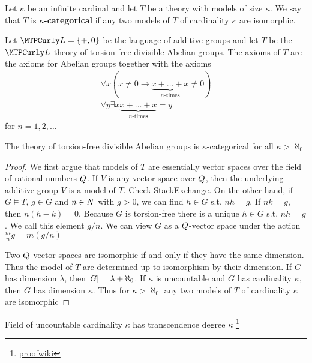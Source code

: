 \documentclass[11pt]{article}
\begin{document}
\begin{definition}[]
Let \(\kappa\) be an infinite cardinal and let \(T\) be a theory with models of
size \(\kappa\). We say that \(T\) is \textbf{\(\kappa\)-categorical} if any two models of
\(T\) of cardinality \(\kappa\) are isomorphic.
\end{definition}

Let \(\call=\{+,0\}\) be the language of additive groups and let \(T\) be the
\(\call\)-theory of torsion-free divisible Abelian groups. The axioms of \(T\)
are the axioms for Abelian groups together with the axioms
\begin{gather*}
\forall x(x\neq 0\to\underbrace{x+\dots+x}_{n\text{-times}}\neq 0)\\
\forall y\exists x\underbrace{x+\dots+x}_{n\text{-times}}=y
\end{gather*}
for \(n=1,2,\dots\)


\begin{proposition}[]
The theory of torsion-free divisible Abelian groups is \(\kappa\)-categorical for
all \(\kappa>\aleph_0\)
\end{proposition}

\begin{proof}
We first argue that models of \(T\) are essentially vector spaces over the
field of rational numbers \(\relax{Q}\). If \(V\) is any vector space over \(\relax{Q}\), then
the underlying additive group \(V\) is a model of \(T\). 
Check \href{https://math.stackexchange.com/questions/1550900/necessary-and-sufficient-conditions-for-an-abelian-group-to-be-a-vector-space-ov/1550954}{StackExchange}.
On the other hand, if
\(G\models T\), \(g\in G\) and \(n\in\relax{N}\) with \(g>0\), we can find 
\(h\in G\) s.t. \(nh=g\). If \(nk=g\), then \(n(h-k)=0\). Because \(G\) is
torsion-free there is a unique \(h\in G\) s.t. \(nh=g\). We call this element 
\(g/n\). We can view \(G\) as a \(\relax{Q}\)-vector space under the action
\(\frac{m}{n}g=m(g/n)\)

Two \(\relax{Q}\)-vector spaces are isomorphic if and only if they have the same
dimension. Thus the model of \(T\) are determined up to isomorphism by their
dimension. If \(G\) has dimension \(\lambda\), then \(\abs{G}=\lambda+\aleph_0\). If \(\kappa\)
is uncountable and \(G\) has cardinality \(\kappa\), then \(G\) has dimension \(\kappa\). Thus for
\(\kappa>\aleph_0\) any two models of \(T\) of cardinality \(\kappa\) are isomorphic
\end{proof}

\begin{lemma}[]
\label{lemmamy1}
Field of uncountable cardinality \(\kappa\) has transcendence degree \(\kappa\)
\footnote{\href{https://proofwiki.org/wiki/Field\_of\_Uncountable\_Cardinality\_K\_has\_Transcendence\_Degree\_K}{proofwiki}}
\end{lemma}
\end{document}
